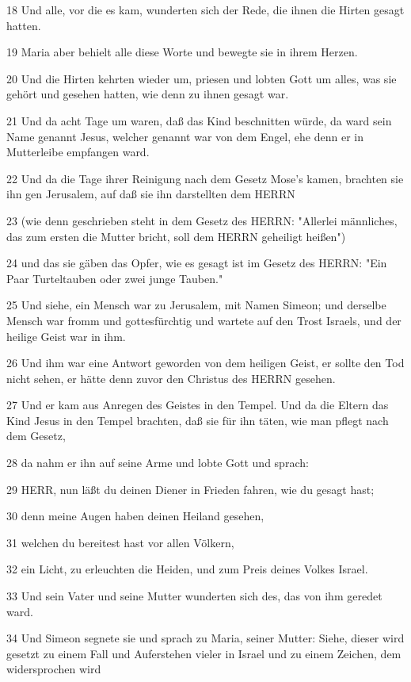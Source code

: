 \par 18 Und alle, vor die es kam, wunderten sich der Rede, die ihnen die Hirten gesagt hatten.
\par 19 Maria aber behielt alle diese Worte und bewegte sie in ihrem Herzen.
\par 20 Und die Hirten kehrten wieder um, priesen und lobten Gott um alles, was sie gehört und gesehen hatten, wie denn zu ihnen gesagt war.
\par 21 Und da acht Tage um waren, daß das Kind beschnitten würde, da ward sein Name genannt Jesus, welcher genannt war von dem Engel, ehe denn er in Mutterleibe empfangen ward.
\par 22 Und da die Tage ihrer Reinigung nach dem Gesetz Mose's kamen, brachten sie ihn gen Jerusalem, auf daß sie ihn darstellten dem HERRN
\par 23 (wie denn geschrieben steht in dem Gesetz des HERRN: "Allerlei männliches, das zum ersten die Mutter bricht, soll dem HERRN geheiligt heißen")
\par 24 und das sie gäben das Opfer, wie es gesagt ist im Gesetz des HERRN: "Ein Paar Turteltauben oder zwei junge Tauben."
\par 25 Und siehe, ein Mensch war zu Jerusalem, mit Namen Simeon; und derselbe Mensch war fromm und gottesfürchtig und wartete auf den Trost Israels, und der heilige Geist war in ihm.
\par 26 Und ihm war eine Antwort geworden von dem heiligen Geist, er sollte den Tod nicht sehen, er hätte denn zuvor den Christus des HERRN gesehen.
\par 27 Und er kam aus Anregen des Geistes in den Tempel. Und da die Eltern das Kind Jesus in den Tempel brachten, daß sie für ihn täten, wie man pflegt nach dem Gesetz,
\par 28 da nahm er ihn auf seine Arme und lobte Gott und sprach:
\par 29 HERR, nun läßt du deinen Diener in Frieden fahren, wie du gesagt hast;
\par 30 denn meine Augen haben deinen Heiland gesehen,
\par 31 welchen du bereitest hast vor allen Völkern,
\par 32 ein Licht, zu erleuchten die Heiden, und zum Preis deines Volkes Israel.
\par 33 Und sein Vater und seine Mutter wunderten sich des, das von ihm geredet ward.
\par 34 Und Simeon segnete sie und sprach zu Maria, seiner Mutter: Siehe, dieser wird gesetzt zu einem Fall und Auferstehen vieler in Israel und zu einem Zeichen, dem widersprochen wird
